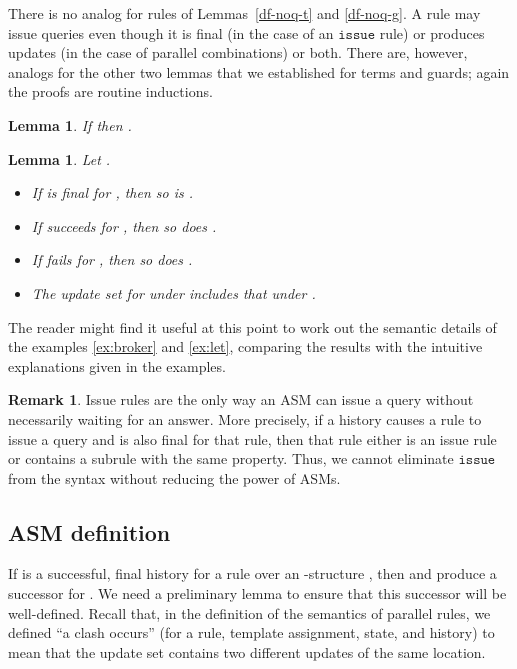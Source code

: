 \documentclass{LMCS}
\newtheorem{la}[thm]{Lemma}
\theoremstyle{definition}
\newtheorem{rmk}[thm]{Remark}
\newenvironment{ls}{\begin{itemize}}{\end{itemize}}
\newcommand{\ttt}[1]{\ensuremath{\mathtt {#1}}}
\begin{document}
There is no analog for rules of Lemmas~\ref{df-noq-t} and
\ref{df-noq-g}.  A rule may issue queries even though it is final
(in the case of an \ttt{issue} rule) or produces updates (in the
case of parallel combinations) or both.  There are, however, analogs
for the other two lemmas that we established for terms and guards;
again the proofs are routine inductions.

\begin{la}   \label{no-rep-r}
If  then .
\end{la}

\begin{la}   \label{mon-r}
Let .
\begin{ls}
  \item If  is final for , then so is .
  \item If  succeeds for , then so does .
  \item If  fails for , then so does .
  \item The update set for  under  includes that under
  .
\end{ls}
\end{la}

The reader might find it useful at this point to work out the
semantic details of the examples \ref{ex:broker} and \ref{ex:let},
comparing the results with the intuitive explanations given in the
examples.

\begin{rmk}
  Issue rules are the only way an ASM can issue a query without
  necessarily waiting for an answer.  More precisely, if a history
  causes a rule to issue a query and is also final for that rule, then
  that rule either is an issue rule or contains a subrule with the
  same property.  Thus, we cannot eliminate \ttt{issue} from the
  syntax without reducing the power of ASMs.
\end{rmk}

\subsection{ASM definition}

If  is a successful, final history for a rule  over an
-structure , then  and  produce a successor for .
We need a preliminary lemma to ensure that this successor will be
well-defined.  Recall that, in the definition of the semantics of
parallel rules, we defined ``a clash occurs'' (for a rule, template
assignment, state, and history) to mean that the update set contains
two different updates of the same location.
\end{document}
